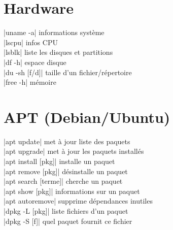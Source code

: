 \documentclass[9pt]{extarticle}
\newenvironment{cmdblock}{%
  \par\setlength{\parindent}{0pt}\setlength{\parskip}{0pt}%
}{\par}
\begin{document}
\begin{multicols}{4}
\section*{Hardware}

\begin{cmdblock}
\code|uname -a| \quad informations système \\
\code|lscpu| \quad infos CPU \\
\code|lsblk| \quad liste les disques et partitions \\
\code|df -h| \quad espace disque \\
\code|du -sh [f/d]| \quad taille d'un fichier/répertoire \\
\code|free -h| \quad mémoire \\
\end{cmdblock}

\section*{APT (Debian/Ubuntu)}
\begin{cmdblock}
\code|apt update| \quad met à jour liste des paquets \\
\code|apt upgrade| \quad met à jour les paquets installés \\
\code|apt install [pkg]| \quad installe un paquet \\
\code|apt remove [pkg]| \quad désinstalle un paquet \\
\code|apt search [terme]| \quad cherche un paquet \\
\code|apt show [pkg]| \quad informations sur un paquet \\
\code|apt autoremove| \quad supprime dépendances inutiles \\
\code|dpkg -L [pkg]| \quad liste fichiers d'un paquet \\
\code|dpkg -S [f]| \quad quel paquet fournit ce fichier \\
\end{cmdblock}



\end{multicols}
\end{document}
